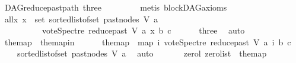 \begin{isabellebody}
\ DAG{\isachardot}{\kern0pt}reduce{\isacharunderscore}{\kern0pt}past{\isacharunderscore}{\kern0pt}path{}\ three\ {}\isanewline
\ \ \ \ \ \ \isamarkupfalse%
\ {\isacharparenleft}{\kern0pt}metis\ blockDAG{\isachardot}{\kern0pt}axioms{\isacharparenleft}{\kern0pt}{}{\isacharparenright}{\kern0pt}{\isacharparenright}{\kern0pt}\ \isanewline
\ \ \ \ \isamarkupfalse%
\ \isamarkupfalse%
\ all{}{\isacharcolon}{\kern0pt}{\isachardoublequoteopen}{\isasymforall}x{\isachardot}{\kern0pt}\ x\ {\isasymin}\ set\ {\isacharparenleft}{\kern0pt}sorted{\isacharunderscore}{\kern0pt}list{\isacharunderscore}{\kern0pt}of{\isacharunderscore}{\kern0pt}set\ {\isacharparenleft}{\kern0pt}past{\isacharunderscore}{\kern0pt}nodes\ V\ a{\isacharparenright}{\kern0pt}{\isacharparenright}{\kern0pt}\ {\isasymlongrightarrow}\isanewline
\ \ \ \ \ \ \ \ \ \ vote{\isacharunderscore}{\kern0pt}Spectre\ {\isacharparenleft}{\kern0pt}reduce{\isacharunderscore}{\kern0pt}past\ V\ a{\isacharparenright}{\kern0pt}\ x\ b\ c\ {\isasymin}\ {\isacharbraceleft}{\kern0pt}{}{\isacharcomma}{\kern0pt}\ {}{\isacharbraceright}{\kern0pt}{\isachardoublequoteclose}\ \isamarkupfalse%
\ {}\ three\ \isamarkupfalse%
\ auto\isanewline
\ \ \ \ \ \isamarkupfalse%
\ the{\isacharunderscore}{\kern0pt}map\ \ the{\isacharunderscore}{\kern0pt}map{\isacharunderscore}{\kern0pt}in{\isacharcolon}{\kern0pt}\ \isanewline
\ \ \ \ \ {\isachardoublequoteopen}the{\isacharunderscore}{\kern0pt}map\ {\isacharequal}{\kern0pt}\ {\isacharparenleft}{\kern0pt}map\ {\isacharparenleft}{\kern0pt}{\isasymlambda}i{\isachardot}{\kern0pt}\ vote{\isacharunderscore}{\kern0pt}Spectre\ {\isacharparenleft}{\kern0pt}reduce{\isacharunderscore}{\kern0pt}past\ V\ a{\isacharparenright}{\kern0pt}\ i\ b\ c{\isacharparenright}{\kern0pt}\ \isanewline
\ \ \ \ {\isacharparenleft}{\kern0pt}sorted{\isacharunderscore}{\kern0pt}list{\isacharunderscore}{\kern0pt}of{\isacharunderscore}{\kern0pt}set\ {\isacharparenleft}{\kern0pt}past{\isacharunderscore}{\kern0pt}nodes\ V\ a{\isacharparenright}{\kern0pt}{\isacharparenright}{\kern0pt}{\isacharparenright}{\kern0pt}{\isachardoublequoteclose}\ \isamarkupfalse%
\ auto\isanewline
\ \ \ \ \ \isamarkupfalse%
\ {\isacharparenleft}{\kern0pt}zero{\isacharunderscore}{\kern0pt}l{\isacharparenright}{\kern0pt}\ {\isachardoublequoteopen}zero{\isacharunderscore}{\kern0pt}list\ \ the{\isacharunderscore}{\kern0pt}map{\isachardoublequoteclose}\ {\isacharbar}{\kern0pt}\isanewline

\end{isabellebody}
